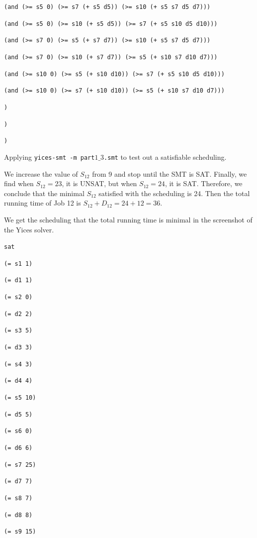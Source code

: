 \documentclass[11pt]{article}
\begin{document}
{{{\tt (and (>= s5 0) (>= s7 (+ s5 d5)) (>= s10 (+ s5 s7 d5 d7)))}

{\tt (and (>= s5 0) (>= s10 (+ s5 d5)) (>= s7 (+ s5 s10 d5 d10)))}

{\tt (and (>= s7 0) (>= s5 (+ s7 d7)) (>= s10 (+ s5 s7 d5 d7)))}

{\tt (and (>= s7 0) (>= s10 (+ s7 d7)) (>= s5 (+ s10 s7 d10 d7)))}

{\tt (and (>= s10 0) (>= s5 (+ s10 d10)) (>= s7 (+ s5 s10 d5 d10)))}

{\tt (and (>= s10 0) (>= s7 (+ s10 d10)) (>= s5 (+ s10 s7 d10 d7)))}

{\tt )}

{\tt )}

{\tt )}

}

\vspace{3mm}

Applying {\tt yices-smt -m part$1\_3$.smt} to test out a satisfiable scheduling.

We increase the value of $S_{12}$ from 9 and stop until the SMT is SAT. Finally, we find when $S_{12} = 23$, it is UNSAT, but when $S_{12} = 24$, it is SAT. Therefore, we conclude that the minimal $S_{12}$ satisfied with the scheduling is 24. Then the total running time of Job 12 is $S_{12} + D_12 = 24 + 12 = 36$.

We get the scheduling that the total running time is minimal in the screenshot of the Yices solver.

{\footnotesize

{\tt sat}

{\tt (= s1 1)}

{\tt (= d1 1)}

{\tt (= s2 0)}

{\tt (= d2 2)}

{\tt (= s3 5)}

{\tt (= d3 3)}

{\tt (= s4 3)}

{\tt (= d4 4)}

{\tt (= s5 10)}

{\tt (= d5 5)}

{\tt (= s6 0)}

{\tt (= d6 6)}

{\tt (= s7 25)}

{\tt (= d7 7)}

{\tt (= s8 7)}

{\tt (= d8 8)}

{\tt (= s9 15)}

}}
\end{document}
